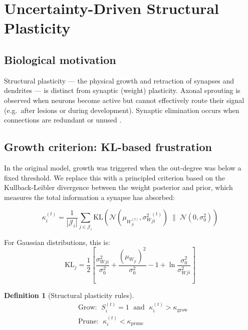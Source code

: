 \documentclass[12pt, a4paper]{article}
\newtheorem{definition}{Definition}[section]
\newcommand{\Normal}{\mathcal{N}}
\newcommand{\KL}{\mathrm{KL}}
\newcommand{\mW}{\mu_{W}}
\newcommand{\sW}{\sigma^{2}_{W}}
\begin{document}
\section{Uncertainty-Driven Structural Plasticity}
\label{sec:structural}

\subsection{Biological motivation}

Structural plasticity --- the physical growth and retraction of synapses and dendrites
--- is distinct from synaptic (weight) plasticity. Axonal sprouting is observed when
neurons become active but cannot effectively route their signal (e.g.\ after lesions or
during development). Synaptic elimination occurs when connections are redundant or
unused \citep{bhatt2009dendritic}.

\subsection{Growth criterion: KL-based frustration}

In the original model, growth was triggered when the out-degree was below a fixed
threshold. We replace this with a principled criterion based on the Kullback-Leibler
divergence between the weight posterior and prior, which measures the total information
a synapse has absorbed:

\begin{equation}
    \kappa_i^{(t)} = \frac{1}{|\mathcal{J}_i|}
    \sum_{j \in \mathcal{J}_i}
    \KL\!\left(\Normal(\mW_{ji}^{(t)}, \sW_{ji}^{(t)}) \;\Big\|\; \Normal(0, \sigma^2_0)\right)
    \label{eq:kl_div}
\end{equation}

For Gaussian distributions, this is:
\begin{equation}
    \KL_j = \frac{1}{2}\left[
        \frac{\sW_{ji}}{\sigma^2_0} + \frac{(\mW_{ji})^2}{\sigma^2_0}
        - 1 + \ln\frac{\sigma^2_0}{\sW_{ji}}
    \right]
    \label{eq:kl_gauss}
\end{equation}

\begin{definition}[Structural plasticity rules]
\begin{align}
    &\text{Grow: }\; S_i^{(t)} = 1 \;\text{ and }\; \kappa_i^{(t)} > \kappa_{\text{grow}}
    \label{eq:grow} \\[4pt]
    &\text{Prune: }\; \kappa_i^{(t)} < \kappa_{\text{prune}}
    \label{eq:prune}
\end{align}
\end{definition}
\end{document}
